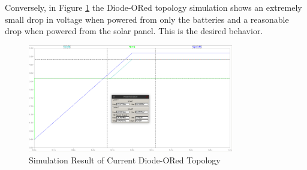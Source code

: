 \documentclass{article}
\numberwithin{figure}{section}
\numberwithin{equation}{section}
\begin{document}
{Conversely, in Figure \ref{fig:doredsimres2} the Diode-ORed topology simulation shows an extremely small drop in voltage when powered from only the batteries and a reasonable drop when powered from the solar panel. This is the desired behavior.
\begin{figure}[H]
	\centering
	\includegraphics[width=0.8\textwidth]{DiodeORres2}
	\caption{Simulation Result of Current Diode-ORed Topology}
	\label{fig:doredsimres2}
\end{figure}

\newpage
}
\end{document}
